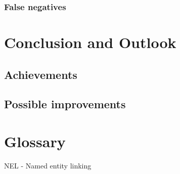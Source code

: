 \documentclass[
        a4paper,     %
        titlepage,   %
        twoside,     %
        parskip      %
        ]{scrartcl} %
\begin{document}
\subsubsection{False negatives}

\section{Conclusion and Outlook}
\subsection{Achievements}
\subsection{Possible improvements}

\clearpage


\newpage
{}
\section*{Glossary}
NEL - Named entity linking
\end{document}

